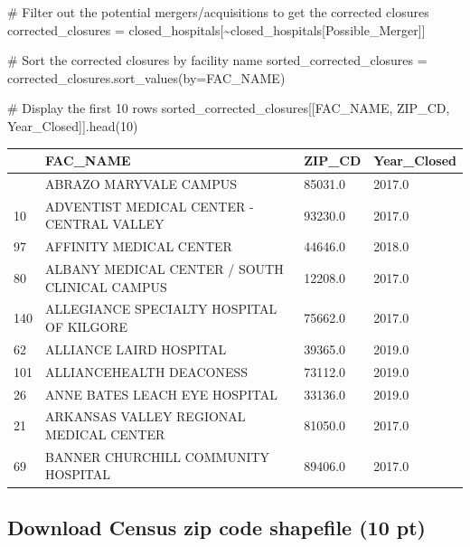\documentclass[
  letterpaper,
  DIV=11,
  numbers=noendperiod]{scrartcl}
\newenvironment{Shaded}{\begin{snugshade}}{\end{snugshade}}
\newcommand{\CommentTok}[1]{\textcolor[rgb]{0.37,0.37,0.37}{#1}}
\newcommand{\DecValTok}[1]{\textcolor[rgb]{0.68,0.00,0.00}{#1}}
\newcommand{\NormalTok}[1]{\textcolor[rgb]{0.00,0.23,0.31}{#1}}
\newcommand{\OperatorTok}[1]{\textcolor[rgb]{0.37,0.37,0.37}{#1}}
\newcommand{\StringTok}[1]{\textcolor[rgb]{0.13,0.47,0.30}{#1}}
\begin{document}
\begin{Shaded}
\begin{Highlighting}[]
\CommentTok{\# Filter out the potential mergers/acquisitions to get the corrected closures}
\NormalTok{corrected\_closures }\OperatorTok{=}\NormalTok{ closed\_hospitals[}\OperatorTok{\textasciitilde{}}\NormalTok{closed\_hospitals[}\StringTok{\textquotesingle{}Possible\_Merger\textquotesingle{}}\NormalTok{]]}

\CommentTok{\# Sort the corrected closures by facility name}
\NormalTok{sorted\_corrected\_closures }\OperatorTok{=}\NormalTok{ corrected\_closures.sort\_values(by}\OperatorTok{=}\StringTok{\textquotesingle{}FAC\_NAME\textquotesingle{}}\NormalTok{)}

\CommentTok{\# Display the first 10 rows}
\NormalTok{sorted\_corrected\_closures[[}\StringTok{\textquotesingle{}FAC\_NAME\textquotesingle{}}\NormalTok{, }\StringTok{\textquotesingle{}ZIP\_CD\textquotesingle{}}\NormalTok{, }\StringTok{\textquotesingle{}Year\_Closed\textquotesingle{}}\NormalTok{]].head(}\DecValTok{10}\NormalTok{)}
\end{Highlighting}
\end{Shaded}

\begin{longtable}[]{@{}llll@{}}
\toprule\noalign{}
& FAC\_NAME & ZIP\_CD & Year\_Closed \\
\midrule\noalign{}
\endhead
\bottomrule\noalign{}
\endlastfoot
4 & ABRAZO MARYVALE CAMPUS & 85031.0 & 2017.0 \\
10 & ADVENTIST MEDICAL CENTER - CENTRAL VALLEY & 93230.0 & 2017.0 \\
97 & AFFINITY MEDICAL CENTER & 44646.0 & 2018.0 \\
80 & ALBANY MEDICAL CENTER / SOUTH CLINICAL CAMPUS & 12208.0 & 2017.0 \\
140 & ALLEGIANCE SPECIALTY HOSPITAL OF KILGORE & 75662.0 & 2017.0 \\
62 & ALLIANCE LAIRD HOSPITAL & 39365.0 & 2019.0 \\
101 & ALLIANCEHEALTH DEACONESS & 73112.0 & 2019.0 \\
26 & ANNE BATES LEACH EYE HOSPITAL & 33136.0 & 2019.0 \\
21 & ARKANSAS VALLEY REGIONAL MEDICAL CENTER & 81050.0 & 2017.0 \\
69 & BANNER CHURCHILL COMMUNITY HOSPITAL & 89406.0 & 2017.0 \\
\end{longtable}

\subsection{Download Census zip code shapefile (10
pt)}\label{download-census-zip-code-shapefile-10-pt}
\end{document}
